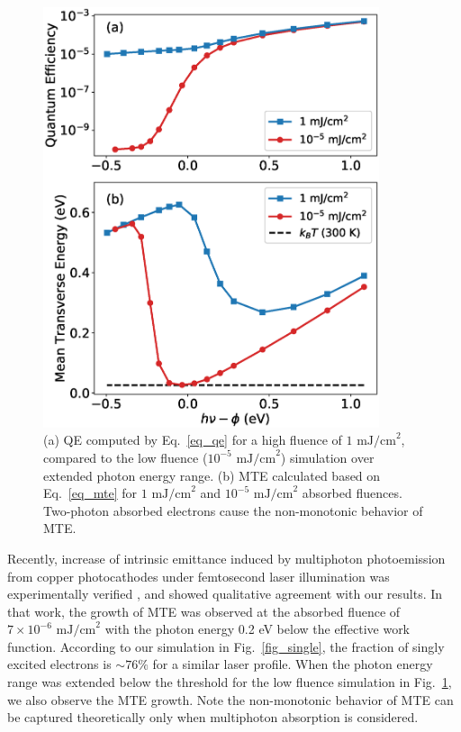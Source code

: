 \begin{figure}
	\centering
	\includegraphics*[width=280pt]{figs/boltzmann/high.eps}
	\caption{(a) QE computed by Eq.~\ref{eq_qe} for a high fluence of $1 \textrm{ mJ/cm}^2$, compared to the low fluence ($10^{-5} \textrm{ mJ/cm}^2$) simulation over extended photon energy range. (b) MTE calculated based on Eq.~\ref{eq_mte} for $1 \textrm{ mJ/cm}^2$ and $10^{-5} \textrm{ mJ/cm}^2$ absorbed fluences. Two-photon absorbed electrons cause the non-monotonic behavior of MTE.}
	\label{fig_high}
\end{figure}


Recently, increase of intrinsic emittance induced by multiphoton photoemission from copper photocathodes under femtosecond laser illumination was experimentally verified \cite{An2018}, and showed qualitative agreement with our results. In that work, the growth of MTE was observed at the absorbed fluence of $7 \times 10^{-6} \textrm{ mJ/cm}^2$ with the photon energy 0.2 eV below the effective work function. According to our simulation in Fig.~\ref{fig_single}, the fraction of singly excited electrons is $\sim 76 \%$ for a similar laser profile.
When the photon energy range was extended below the threshold for the low fluence simulation in Fig.~\ref{fig_high}, we also observe the MTE growth.
Note the non-monotonic behavior of MTE can be captured theoretically only when multiphoton absorption is considered.



